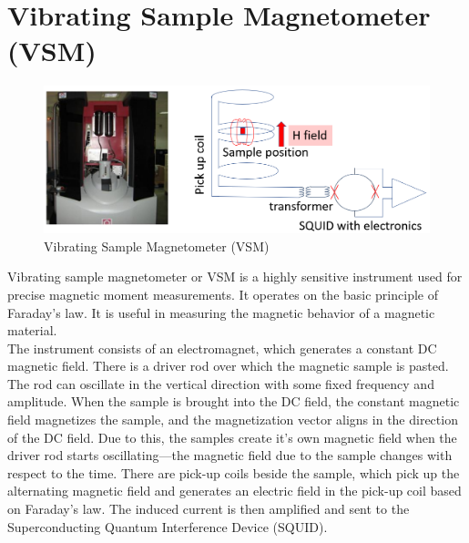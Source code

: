 \documentclass[12pt,a4paper,bold]{thesis}
\theoremstyle{thm}
\theoremstyle{definition}
\begin{document}
\section{Vibrating Sample Magnetometer (VSM)}
\begin{figure}[H]
	\centering
   \includegraphics[width=12cm]{Images/54.png} 
   \caption{Vibrating Sample Magnetometer (VSM)}
\end{figure}
Vibrating sample magnetometer or VSM is a highly sensitive instrument used for precise magnetic moment measurements. It operates on the basic principle of Faraday's law. It is useful in measuring the magnetic behavior of a magnetic material.\\
The instrument consists of an electromagnet, which generates a constant DC magnetic field. There is a driver rod over which the magnetic sample is pasted. The rod can oscillate in the vertical direction with some fixed frequency and amplitude. When the sample is brought into the DC field, the constant magnetic field magnetizes the sample, and the magnetization vector aligns in the direction of the DC field. Due to this, the samples create it's own magnetic field when the driver rod starts oscillating—the magnetic field due to the sample changes with respect to the time. There are pick-up coils beside the sample, which pick up the alternating magnetic field and generates an electric field in the pick-up coil based on Faraday's law. The induced current is then amplified and sent to the Superconducting Quantum Interference Device (SQUID).
\end{document}
